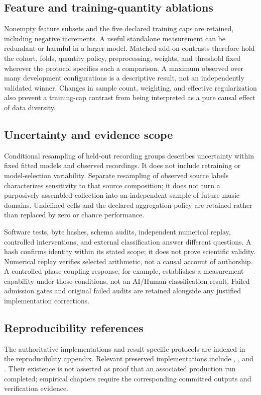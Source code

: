 \subsection{Feature and training-quantity ablations}

Nonempty feature subsets and the five declared training caps are retained,
including negative increments. A useful standalone measurement can be redundant
or harmful in a larger model. Matched add-on contrasts therefore hold the cohort,
folds, quantity policy, preprocessing, weights, and threshold fixed wherever the
protocol specifies such a comparison. A maximum observed over many development
configurations is a descriptive result, not an independently validated winner.
Changes in sample count, weighting, and effective regularization also prevent a
training-cap contrast from being interpreted as a pure causal effect of data
diversity.

\subsection{Uncertainty and evidence scope}

Conditional resampling of held-out recording groups describes uncertainty
within fixed fitted models and observed recordings. It does not include
retraining or model-selection variability. Separate resampling of observed source
labels characterizes sensitivity to that source composition; it does not turn
a purposively assembled collection into an independent sample of future music
domains. Undefined cells and the declared aggregation policy are retained rather
than replaced by zero or chance performance.

Software tests, byte hashes, schema audits, independent numerical replay,
controlled interventions, and external classification answer different questions.
A hash confirms identity within its stated scope; it does not prove scientific
validity. Numerical replay verifies selected arithmetic, not a causal account of
authorship. A controlled phase-coupling response, for example, establishes a
measurement capability under those conditions, not an AI/Human classification
result. Failed admission gates and original failed audits are retained alongside
any justified implementation corrections.

\subsection{Reproducibility references}

The authoritative implementations and result-specific protocols are indexed in
the reproducibility appendix. Relevant preserved implementations include
,
, and
. Their existence is not asserted as
proof that an associated production run completed; empirical chapters require
the corresponding committed outputs and verification evidence.
